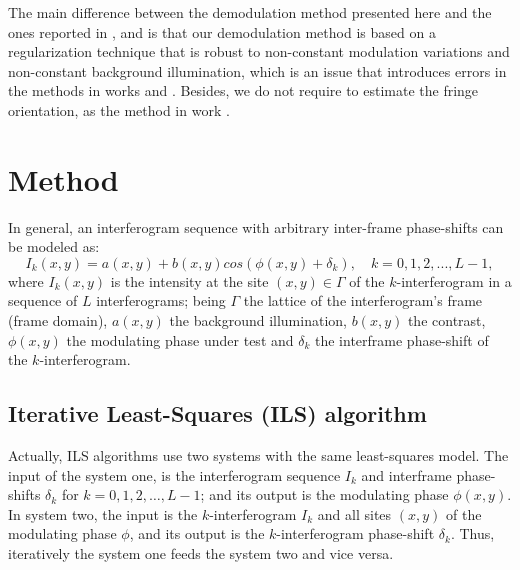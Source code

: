 \documentclass[letterpaper,12pt]{article}   %
\begin{document}
The main difference between the demodulation method presented here and
the ones reported in \cite{a14},\cite{a15} and \cite{a17} is that our
demodulation method is based on a regularization technique that is
robust to non-constant modulation variations and non-constant
background illumination, which is an issue that introduces errors in
the methods in works \cite{a14} and \cite{a15}. Besides, we do not
require to estimate the fringe orientation, as the method in work
\cite{a17}.

\section{Method}

In general, an interferogram sequence with arbitrary inter-frame
phase-shifts can be modeled as:
\begin{equation} \label{eq:I_k1}
  I_k(x,y)=a(x,y)+b(x,y)cos(\phi(x,y)+\delta_k),\quad k=0,1,2,...,L-1,
\end{equation}
where $I_k(x,y)$ is the intensity at the site $(x,y)\in\Gamma$ of the
$k$-interferogram in a sequence of $L$ interferograms; being $\Gamma$
the lattice of the interferogram's frame (frame domain), $a(x,y)$ the
background illumination, $b(x,y)$ the contrast, $\phi(x,y)$ the
modulating phase under test and $\delta_k$ the interframe phase-shift
of the $k$-interferogram.

\subsection{Iterative Least-Squares (ILS) algorithm}
Actually, ILS algorithms use two systems with the same least-squares
model. The input of the system one, is the interferogram sequence
$I_k$ and interframe phase-shifts $\delta_k$ for $k=0,1,2,\dots,L-1$;
and its output is the modulating phase $\phi(x,y)$. In system two, the
input is the $k$-interferogram $I_k$ and all sites $(x,y)$ of the
modulating phase $\phi$, and its output is the $k$-interferogram
phase-shift $\delta_k$. Thus, iteratively the system one feeds the
system two and vice versa.
\end{document}
